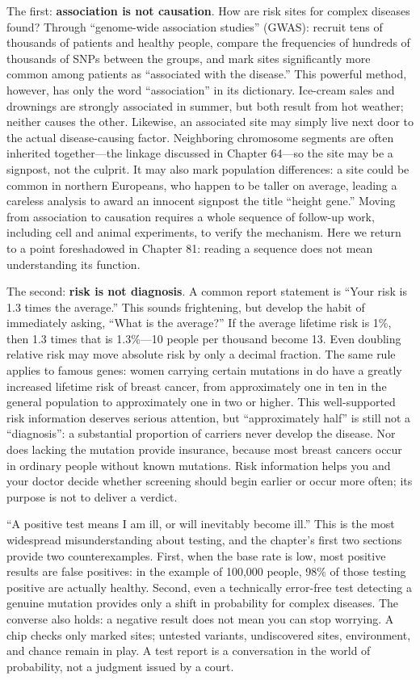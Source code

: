 The first: \textbf{association is not causation}. How are risk sites for complex diseases found? Through ``genome-wide association studies'' (GWAS): recruit tens of thousands of patients and healthy people, compare the frequencies of hundreds of thousands of SNPs between the groups, and mark sites significantly more common among patients as ``associated with the disease.'' This powerful method, however, has only the word ``association'' in its dictionary. Ice-cream sales and drownings are strongly associated in summer, but both result from hot weather; neither causes the other. Likewise, an associated site may simply live next door to the actual disease-causing factor. Neighboring chromosome segments are often inherited together---the linkage discussed in Chapter 64---so the site may be a signpost, not the culprit. It may also mark population differences: a site could be common in northern Europeans, who happen to be taller on average, leading a careless analysis to award an innocent signpost the title ``height gene.'' Moving from association to causation requires a whole sequence of follow-up work, including cell and animal experiments, to verify the mechanism. Here we return to a point foreshadowed in Chapter 81: reading a sequence does not mean understanding its function.

The second: \textbf{risk is not diagnosis}. A common report statement is ``Your risk is 1.3 times the average.'' This sounds frightening, but develop the habit of immediately asking, ``What is the average?'' If the average lifetime risk is 1\%, then 1.3 times that is 1.3\%---10 people per thousand become 13. Even doubling relative risk may move absolute risk by only a decimal fraction. The same rule applies to famous genes: women carrying certain mutations in  do have a greatly increased lifetime risk of breast cancer, from approximately one in ten in the general population to approximately one in two or higher. This well-supported risk information deserves serious attention, but ``approximately half'' is still not a ``diagnosis'': a substantial proportion of carriers never develop the disease. Nor does lacking the mutation provide insurance, because most breast cancers occur in ordinary people without known mutations. Risk information helps you and your doctor decide whether screening should begin earlier or occur more often; its purpose is not to deliver a verdict.

\begin{wuqu}
``A positive test means I am ill, or will inevitably become ill.'' This is the most widespread misunderstanding about testing, and the chapter's first two sections provide two counterexamples. First, when the base rate is low, most positive results are false positives: in the example of 100,000 people, 98\% of those testing positive are actually healthy. Second, even a technically error-free test detecting a genuine mutation provides only a shift in probability for complex diseases. The converse also holds: a negative result does not mean you can stop worrying. A chip checks only marked sites; untested variants, undiscovered sites, environment, and chance remain in play. A test report is a conversation in the world of probability, not a judgment issued by a court.
\end{wuqu}

